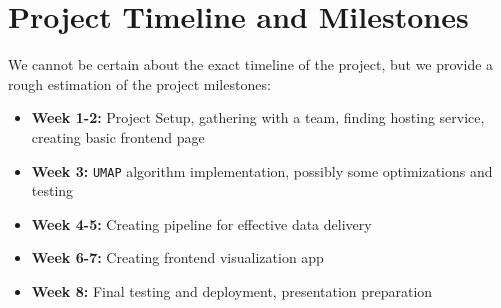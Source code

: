 \documentclass{article}
\begin{document}
\section{Project Timeline and Milestones}
We cannot be certain about the exact timeline of the project, but we
provide a rough estimation of the project milestones:

\begin{itemize}
	\item \textbf{Week 1-2:} Project Setup, gathering with a team,
	      finding hosting service, creating basic frontend page
	\item \textbf{Week 3:} \texttt{UMAP} algorithm implementation,
	      possibly some optimizations and testing
	\item \textbf{Week 4-5:} Creating pipeline for effective data delivery
	\item \textbf{Week 6-7:} Creating frontend visualization app
	\item \textbf{Week 8:} Final testing and deployment, presentation 
    preparation
\end{itemize}
\end{document}
